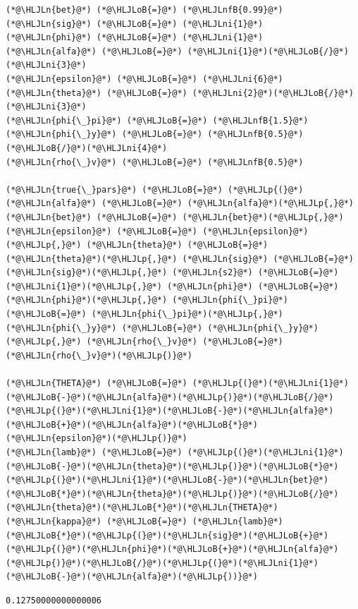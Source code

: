 \documentclass[12pt,a4paper]{article}
\newcommand{\HLJLn}[1]{#1}
\newcommand{\HLJLnfB}[1]{\textcolor[RGB]{59,151,46}{#1}}
\newcommand{\HLJLni}[1]{\textcolor[RGB]{59,151,46}{#1}}
\newcommand{\HLJLoB}[1]{\textcolor[RGB]{102,102,102}{\textbf{#1}}}
\newcommand{\HLJLp}[1]{#1}
\begin{document}
\begin{lstlisting}
(*@\HLJLn{bet}@*) (*@\HLJLoB{=}@*) (*@\HLJLnfB{0.99}@*)
(*@\HLJLn{sig}@*) (*@\HLJLoB{=}@*) (*@\HLJLni{1}@*)
(*@\HLJLn{phi}@*) (*@\HLJLoB{=}@*) (*@\HLJLni{1}@*)
(*@\HLJLn{alfa}@*) (*@\HLJLoB{=}@*) (*@\HLJLni{1}@*)(*@\HLJLoB{/}@*)(*@\HLJLni{3}@*)
(*@\HLJLn{epsilon}@*) (*@\HLJLoB{=}@*) (*@\HLJLni{6}@*)
(*@\HLJLn{theta}@*) (*@\HLJLoB{=}@*) (*@\HLJLni{2}@*)(*@\HLJLoB{/}@*)(*@\HLJLni{3}@*)
(*@\HLJLn{phi{\_}pi}@*) (*@\HLJLoB{=}@*) (*@\HLJLnfB{1.5}@*)
(*@\HLJLn{phi{\_}y}@*) (*@\HLJLoB{=}@*) (*@\HLJLnfB{0.5}@*)(*@\HLJLoB{/}@*)(*@\HLJLni{4}@*)
(*@\HLJLn{rho{\_}v}@*) (*@\HLJLoB{=}@*) (*@\HLJLnfB{0.5}@*)

(*@\HLJLn{true{\_}pars}@*) (*@\HLJLoB{=}@*) (*@\HLJLp{(}@*)(*@\HLJLn{alfa}@*) (*@\HLJLoB{=}@*) (*@\HLJLn{alfa}@*)(*@\HLJLp{,}@*) (*@\HLJLn{bet}@*) (*@\HLJLoB{=}@*) (*@\HLJLn{bet}@*)(*@\HLJLp{,}@*) (*@\HLJLn{epsilon}@*) (*@\HLJLoB{=}@*) (*@\HLJLn{epsilon}@*)(*@\HLJLp{,}@*) (*@\HLJLn{theta}@*) (*@\HLJLoB{=}@*) (*@\HLJLn{theta}@*)(*@\HLJLp{,}@*) (*@\HLJLn{sig}@*) (*@\HLJLoB{=}@*) (*@\HLJLn{sig}@*)(*@\HLJLp{,}@*) (*@\HLJLn{s2}@*) (*@\HLJLoB{=}@*) (*@\HLJLni{1}@*)(*@\HLJLp{,}@*) (*@\HLJLn{phi}@*) (*@\HLJLoB{=}@*) (*@\HLJLn{phi}@*)(*@\HLJLp{,}@*) (*@\HLJLn{phi{\_}pi}@*) (*@\HLJLoB{=}@*) (*@\HLJLn{phi{\_}pi}@*)(*@\HLJLp{,}@*) (*@\HLJLn{phi{\_}y}@*) (*@\HLJLoB{=}@*) (*@\HLJLn{phi{\_}y}@*)(*@\HLJLp{,}@*) (*@\HLJLn{rho{\_}v}@*) (*@\HLJLoB{=}@*) (*@\HLJLn{rho{\_}v}@*)(*@\HLJLp{)}@*)

(*@\HLJLn{THETA}@*) (*@\HLJLoB{=}@*) (*@\HLJLp{(}@*)(*@\HLJLni{1}@*)(*@\HLJLoB{-}@*)(*@\HLJLn{alfa}@*)(*@\HLJLp{)}@*)(*@\HLJLoB{/}@*)(*@\HLJLp{(}@*)(*@\HLJLni{1}@*)(*@\HLJLoB{-}@*)(*@\HLJLn{alfa}@*)(*@\HLJLoB{+}@*)(*@\HLJLn{alfa}@*)(*@\HLJLoB{*}@*)(*@\HLJLn{epsilon}@*)(*@\HLJLp{)}@*)
(*@\HLJLn{lamb}@*) (*@\HLJLoB{=}@*) (*@\HLJLp{(}@*)(*@\HLJLni{1}@*)(*@\HLJLoB{-}@*)(*@\HLJLn{theta}@*)(*@\HLJLp{)}@*)(*@\HLJLoB{*}@*)(*@\HLJLp{(}@*)(*@\HLJLni{1}@*)(*@\HLJLoB{-}@*)(*@\HLJLn{bet}@*)(*@\HLJLoB{*}@*)(*@\HLJLn{theta}@*)(*@\HLJLp{)}@*)(*@\HLJLoB{/}@*)(*@\HLJLn{theta}@*)(*@\HLJLoB{*}@*)(*@\HLJLn{THETA}@*)
(*@\HLJLn{kappa}@*) (*@\HLJLoB{=}@*) (*@\HLJLn{lamb}@*)(*@\HLJLoB{*}@*)(*@\HLJLp{(}@*)(*@\HLJLn{sig}@*)(*@\HLJLoB{+}@*)(*@\HLJLp{(}@*)(*@\HLJLn{phi}@*)(*@\HLJLoB{+}@*)(*@\HLJLn{alfa}@*)(*@\HLJLp{)}@*)(*@\HLJLoB{/}@*)(*@\HLJLp{(}@*)(*@\HLJLni{1}@*)(*@\HLJLoB{-}@*)(*@\HLJLn{alfa}@*)(*@\HLJLp{))}@*)
\end{lstlisting}

\begin{lstlisting}
0.12750000000000006
\end{lstlisting}
\end{document}
